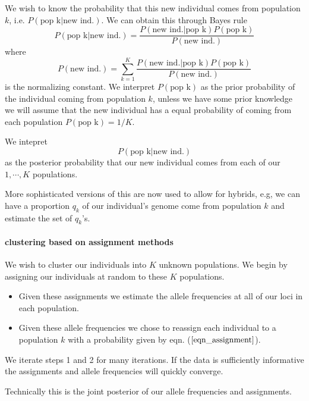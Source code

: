\documentclass[12pt]{article}
\begin{document}
We wish to know the probability that this new individual comes from population $k$, i.e. $P(\textrm{pop k} | \textrm{new ind.})$. We can obtain this through Bayes rule 
\begin{equation}
 P(\textrm{pop k} | \textrm{new ind.})  = \frac{P(\textrm{new ind.} | \textrm{pop k}) P(\textrm{pop k})}{P(\textrm{new ind.})}
\end{equation}
where 
\begin{equation}
P(\textrm{new ind.}) = \sum_{k=1}^K  \frac{P(\textrm{new ind.} | \textrm{pop k}) P(\textrm{pop k})}{P(\textrm{new ind.})}
\end{equation}
is the normalizing constant. We interpret $P(\textrm{pop k})$ as the prior probability of the individual coming from population $k$, unless we have some prior knowledge we will assume that the new individual has a equal probability of coming from each population $P(\textrm{pop k})=1/K$.  

We intepret 
\begin{equation}
 P(\textrm{pop k} | \textrm{new ind.})
\end{equation}
as the posterior probability that our new individual comes from each of our $1,\cdots, K$ populations.

More sophisticated versions of this are now used to allow for hybrids, e.g, we can have a proportion $q_k$ of our individual's genome come from population $k$ and estimate the set of $q_k$'s.
\paragraph{clustering based on assignment methods}
We wish to cluster our individuals into $K$ unknown populations. We begin by assigning our individuals at random to these $K$ populations. 
\begin{itemize}
\item Given these assignments we estimate the allele frequencies at all of our loci in each population. 
\item Given these allele frequencies we chose to reassign each individual to a population $k$ with a probability given by eqn. ($\ref{eqn_assignment}$).
\end{itemize}
We iterate steps 1 and 2 for many iterations. If the data is sufficiently informative the assignments and allele frequencies will quickly converge. 

Technically this is the joint posterior of our allele frequencies and assignments. 
\end{document}
